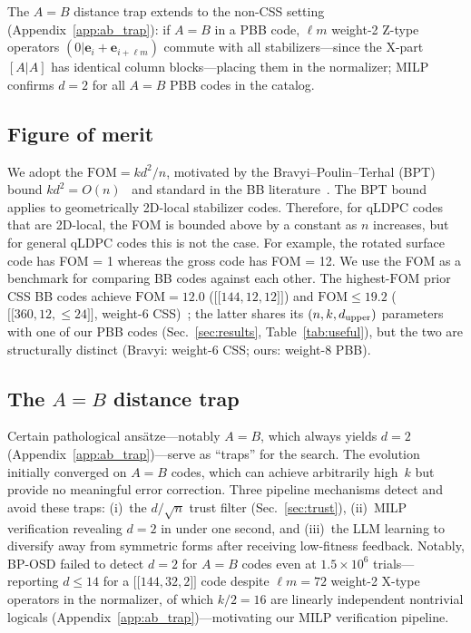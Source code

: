 \documentclass[aps,prxquantum,twocolumn,superscriptaddress,nofootinbib]{revtex4-2}
\newcommand{\dblbrk}[1]{\ensuremath{\lbrack\!\lbrack #1 \rbrack\!\rbrack}}
\newcommand{\code}[1]{\dblbrk{#1}}
\newcommand{\FOM}{\ensuremath{\mathrm{FOM}}}
\begin{document}
The $A = B$ distance trap extends to the non-CSS setting (Appendix~\ref{app:ab_trap}): if $A = B$ in a PBB code, $\ell m$ weight-2 Z-type operators $(0|\mathbf{e}_i + \mathbf{e}_{i+\ell m})$ commute with all stabilizers---since the X-part $[A|A]$ has identical column blocks---placing them in the normalizer; MILP confirms $d = 2$ for all $A = B$ PBB codes in the catalog.

\subsection{Figure of merit}
\label{sec:fom}

We adopt the $\FOM = kd^2/n$, motivated by the Bravyi--Poulin--Terhal (BPT) bound $kd^2 = O(n)$~\cite{bravyi2010tradeoffs} and standard in the BB literature~\cite{bravyi2024high,liang2025generalized}.
The BPT bound applies to geometrically 2D-local stabilizer codes. Therefore, for qLDPC codes that are 2D-local, the FOM is bounded above by a constant as $n$ increases, but for general qLDPC codes this is not the case. For example, the rotated surface code has FOM = 1 whereas the gross code has FOM = 12. We use the FOM as a benchmark for comparing BB codes against each other.
The highest-$\FOM$ prior CSS BB codes achieve $\FOM = 12.0$ ($\code{144,12,12}$) and $\FOM \leq 19.2$ ($\code{360,12,{\leq}24}$, weight-6 CSS)~\cite{bravyi2024high}; the latter shares its $(n,k,d_{\rm upper})$ parameters with one of our PBB codes (Sec.~\ref{sec:results}, Table~\ref{tab:useful}), but the two are structurally distinct (Bravyi: weight-6 CSS; ours: weight-8 PBB).

\subsection{The $A = B$ distance trap}
\label{sec:ab_trap}

Certain pathological ansätze---notably $A = B$, which always yields $d = 2$ (Appendix~\ref{app:ab_trap})---serve as ``traps'' for the search.
The evolution initially converged on $A = B$ codes, which can achieve arbitrarily high~$k$ but provide no meaningful error correction.
Three pipeline mechanisms detect and avoid these traps: (i)~the $d/\sqrt{n}$ trust filter (Sec.~\ref{sec:trust}), (ii)~MILP verification revealing $d = 2$ in under one second, and (iii)~the LLM learning to diversify away from symmetric forms after receiving low-fitness feedback.
Notably, BP-OSD failed to detect $d = 2$ for $A = B$ codes even at $1.5 \times 10^6$ trials---reporting $d \leq 14$ for a $\code{144,32,2}$ code despite $\ell m = 72$ weight-2 X-type operators in the normalizer, of which $k/2 = 16$ are linearly independent nontrivial logicals (Appendix~\ref{app:ab_trap})---motivating our MILP verification pipeline.
\end{document}
